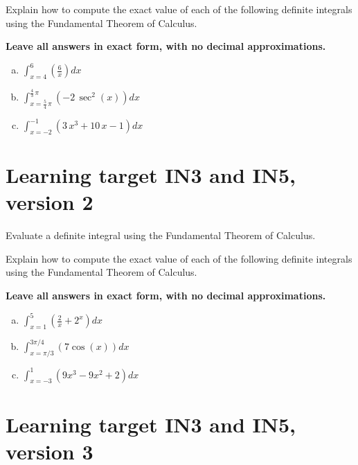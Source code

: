 Explain how to compute the exact value of each of the following definite integrals using the Fundamental Theorem of Calculus. 

\textbf{Leave all answers in exact form, with no decimal approximations. }

\begin{enumerate}[(a)]
\item
 \(\displaystyle \int_{ x=4 }^{ 6 } \left( \frac{6}{x} \right) dx\) 

 \vfill

\item
 \(\int_{x= \frac{5}{4} \, \pi }^{ \frac{4}{3} \, \pi } \left( -2 \, \sec^2\left(x\right) \right) dx\)

\vfill

\item
 \(\int_{x= -2 }^{ -1 } \left( 3 \, x^{3} + 10 \, x - 1 \right) dx\)
\vfill
\end{enumerate}
\pagebreak

\section{Learning target IN3 and IN5, version 2} 

Evaluate a definite integral using the Fundamental Theorem of Calculus.

\hrulefill


Explain how to compute the exact value of each of the following definite integrals using the Fundamental Theorem of Calculus. 

\textbf{Leave all answers in exact form, with no decimal approximations. }

\begin{enumerate}[(a)]
\item
\(\displaystyle \int_{ x=1 }^{ 5 } \left( \frac{2}{x} + 2^x\right) dx\) 
\vfill
\item 
\(\displaystyle \int_{x=\pi/3}^{3\pi/4} \left( 7\cos(x) \right) dx\)
\vfill
\item
\(\displaystyle \int_{x= -3 }^{ 1 } \left( 9x^3 -9x^2 + 2\right) dx\)
\vfill

\end{enumerate}
\pagebreak

\section{Learning target IN3 and IN5, version 3} 

